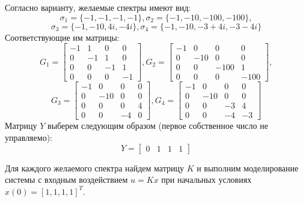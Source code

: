 Согласно варианту, желаемые спектры имеют вид:
\begin{equation*}
    \sigma_1 = \{-1,-1,-1,-1\}, \sigma_2 = \{-1,-10,-100,-100\}, 
\end{equation*}
\begin{equation*}
    \sigma_3 = \{-1,-10,4i,-4i\}, \sigma_4 = \{-1,-10,-3+4i,-3-4i\}
\end{equation*}
Соответствующие им матрицы:
\begin{equation*}
    G_1 = \begin{bmatrix}
        -1 & 1 & 0 & 0 \\
        0 & -1 & 1 & 0 \\
        0 & 0 & -1 & 1 \\
        0 & 0 & 0 & -1
    \end{bmatrix},
    G_2 = \begin{bmatrix}
        -1 & 0 & 0 & 0 \\
        0 & -10 & 0 & 0 \\
        0 & 0 & -100 & 1 \\
        0 & 0 & 0 & -100
    \end{bmatrix},
\end{equation*}
\begin{equation*}
    G_3 = \begin{bmatrix}
        -1 & 0 & 0 & 0 \\
        0 & -10 & 0 & 0 \\
        0 & 0 & 0 & 4 \\
        0 & 0 & -4 & 0
    \end{bmatrix},
    G_4 = \begin{bmatrix}
        -1 & 0 & 0 & 0 \\
        0 & -10 & 0 & 0 \\
        0 & 0 & -3 & 4 \\
        0 & 0 & -4 & -3
    \end{bmatrix}
\end{equation*}
Матрицу $Y$ выберем следующим образом (первое собственное число не управляемо):
\begin{equation*}
    Y = \begin{bmatrix}
        0 & 1 & 1 & 1
    \end{bmatrix}
\end{equation*}

Для каждого желаемого спектра найдем матрицу $K$ и выполним моделирование системы с 
входным воздействием $u = Kx$ при начальных условиях $x(0)=[1, 1, 1, 1]^T$.


